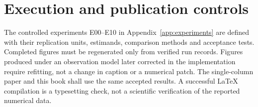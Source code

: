 \section{Execution and publication controls}
The controlled experiments E00--E10 in Appendix~\ref{app:experiments} are defined with their
replication units, estimands, comparison methods and acceptance tests. Completed figures must
be regenerated only from verified run records. Figures produced under an observation model later
corrected in the implementation require refitting, not a change in caption or a numerical patch.
The single-column paper and this book shall use the same accepted results. A successful LaTeX
compilation is a typesetting check, not a scientific verification of the reported numerical data.
